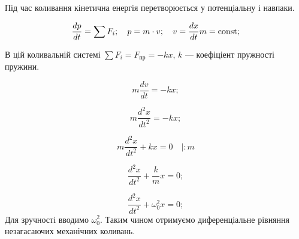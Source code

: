 \documentclass[a4paper,oneside,12pt,DIV=9,titlepage,toc]{scrartcl}
\begin{document}
			Під час коливання кінетична енергія перетворюється у потенціальну і навпаки.
			
			\[
				\frac{dp}{dt} = \sum F_i; \quad
				p = m \cdot v; \quad
				v  = \frac{dx}{dt} \\
				m = \mathrm{const};
			\]
			
			В цій коливальній системі $\sum F_i = F_{\textrm{пр}} = -kx$, $k$ --- коефіціент пружності пружини.
			
			\[
				m \frac{dv}{dt} = -kx;
			\]
			
			\[
				m \frac{d^2x}{dt^2} = -kx;
			\]
			
			\[
				m \frac{d^2x}{dt^2} + kx = 0 \quad | : m
			\]
			
			\[
				\frac{d^2x}{dt^2} + \frac{k}{m}x = 0;
			\]
			
			\[
				\frac{d^2x}{dt^2} + \omega_0^2 x = 0;
			\]
			Для зручності вводимо $\omega_0^2$. Таким чином отримуємо диференціальне рівняння незагасаючих механічних коливань.
\end{document}
